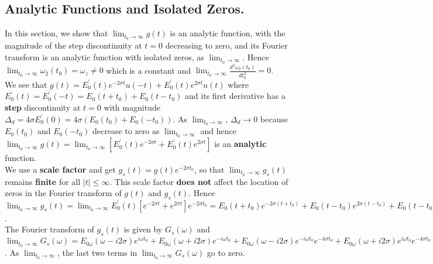 \documentclass[11pt]{elsarticle}
\begin{document}
\clearpage
\subsection{\label{sec:Section_3_1} \textbf{ Analytic Functions and Isolated Zeros.  } \protect\\  \lowercase{} }

In this section, we show that $\lim_{t_0 \to \infty} g(t)$ is an analytic function, with the magnitude of the step discontinuity at $t=0$ decreasing to zero, and its Fourier transform is an analytic function with isolated zeros, as $\lim_{t_0 \to \infty}$. Hence $\lim_{t_0 \to \infty} \omega_{2}(t_0) = \omega_z \neq 0$ which is a constant and $\lim_{t_0 \to \infty} \frac{d^2 \omega_{2}(t_0)}{dt_0^2} = 0$. \\

We see that $g(t) = E_0^{'}(t) e^{-2 \sigma t} u(-t) + E_0^{'}(t) e^{2 \sigma t} u(t)  $ where $E_0^{'}(t) = E_0^{'}(-t)  =  E_0(t + t_0) +  E_0(t - t_0)$ and its first derivative has a \textbf{step} discontinuity at $t=0$ with magnitude $\Delta_d = 4 \sigma E_0^{'}(0) = 4 \sigma (E_0(t_0) + E_0(-t_0))$. As $\lim_{t_0 \to \infty}$, $\Delta_d \to 0$ because $E_0(t_0)$ and $E_0(-t_0)$ decrease to zero as  $\lim_{t_0 \to \infty}$ and hence $\lim_{t_0 \to \infty} g(t) =\lim_{t_0 \to \infty} [  E_0^{'}(t) e^{-2 \sigma t}  + E_0^{'}(t) e^{2 \sigma t} ]$  is an \textbf{analytic} function.\\

We use a \textbf{scale factor} and get $g_s(t) = g(t)  e^{-2 \sigma t_0}$, so that $\lim_{t_0 \to \infty} g_s(t)$ remains \textbf{finite} for all $|t| \leq \infty$. This scale factor \textbf{does not} affect the location of zeros in the Fourier transform of $g(t)$ and $g_s(t)$. Hence $\lim_{t_0 \to \infty} g_s(t) =\lim_{t_0 \to \infty} E_0^{'}(t) [ e^{-2 \sigma t}  +  e^{2 \sigma t} ] e^{-2 \sigma t_0} = E_0(t + t_0) e^{-2 \sigma (t+t_0)} + E_0(t - t_0) e^{2 \sigma (t-t_0)} + E_0(t - t_0) e^{-2 \sigma (t+t_0)} + E_0(t + t_0) e^{2 \sigma (t-t_0)} $.\\

The Fourier transform of $g_s(t)$ is given by $G_s(\omega)$ and $\lim_{t_0 \to \infty} G_s(\omega) = E_{0\omega}(\omega - i 2 \sigma) e^{i \omega t_0} + E_{0\omega}(\omega + i 2 \sigma) e^{-i \omega t_0} +  E_{0\omega}(\omega - i 2 \sigma) e^{-i \omega t_0}  e^{-4 \sigma t_0} + E_{0\omega}(\omega + i 2 \sigma) e^{i \omega t_0}  e^{-4 \sigma t_0} $. As  $\lim_{t_0 \to \infty}$, the last two terms in $\lim_{t_0 \to \infty} G_s(\omega)$ go to zero.\\
\end{document}
